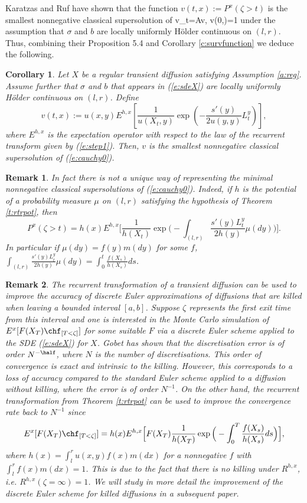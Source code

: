 \documentclass[11pt,reqno]{amsart}
\numberwithin{equation}{section}
\newtheorem{corollary}{Corollary}[section]
\newtheorem{remark}{Remark}[section]
\begin{document}
Karatzas and Ruf \cite{KR} have shown that the function $v(t,x):=P^x(\zeta>t)$ is the smallest nonnegative classical supersolution of 
\be \label{e:cauchy0}
v_t=Av, \qquad v(0,\cdot)=1
\ee
under the assumption that $\sigma$ and $b$ are locally uniformly H\"older continuous on $(l,r)$.  Thus,  combining their Proposition 5.4 and Corollary \ref{c:survfunction} we deduce the following.
\begin{corollary}  Let $X$ be a regular transient diffusion satisfying Assumption \ref{a:reg}. Assume further that $\sigma$ and $b$ that appears in (\ref{e:sdeX}) are locally uniformly H\"older continuous on $(l,r)$. Define
\[
v(t,x):= u(x,y)E^{h,x}\left[\frac{1}{u(X_t,y)}\exp\left(-\frac{s'(y)}{2u(y,y)}L^y_t\right)\right],
\]
where $E^{h,x}$ is the expectation operator with respect to the law of the recurrent transform given by (\ref{e:step1}).  Then, $v$ is the smallest nonnegative classical supersolution of (\ref{e:cauchy0}).
\end{corollary}
\begin{remark}
	In fact there is not a unique way of representing the minimal nonnegative classical supersolutions of (\ref{e:cauchy0}). Indeed, if $h$ is the potential of a probability measure $\mu$ on $(l,r)$ satisfying the hypothesis of Theorem \ref{t:rtrpot}, then
	\[
	P^x(\zeta>t)=  h(x)E^{h,x}\Big[\frac{1}{h(X_t)}\exp\Big(-\int_{(l,r)}\frac{s'(y)L^y_t}{2h(y)}\mu(dy)\Big)\Big].
	\] 
	In particular if $\mu(dy)=f(y)m(dy)$ for some $f$, $\int_{(l,r)}\frac{s'(y)L^y_t}{2h(y)}\mu(dy)=\int_0^t \frac{f(X_s)}{h(X_s)}ds$. 
\end{remark}
\begin{remark} \label{r:simulation}
	The recurrent transformation of a transient diffusion can be used to improve the accuracy of discrete Euler approximations of diffusions that are killed when leaving a bounded interval $[a,b]$. Suppose $\zeta$ represents the first exit time from this interval and one is interested in the Monte Carlo simulation of $E^x[F(X_T)\chf_{[T<\zeta]}]$ for some suitable $F$ via a discrete Euler scheme applied to the SDE (\ref{e:sdeX}) for $X$. Gobet \cite{GobetKilled} has shown that the discretisation error is of order $N^{-\half}$, where $N$ is the number of discretisations. This order of convergence is exact and intrinsic to the killing. However, this corresponds to a loss of accuracy compared to the standard Euler scheme applied to a diffusion without killing, where the error is of order $N^{-1}$. On the other hand, the recurrent transformation from Theorem \ref{t:rtrpot} can be used to improve the convergence rate back to $N^{-1}$ since
	\[
	E^x[F(X_T)\chf_{[T<\zeta]}]= h(x)E^{h,x}\Big[F(X_T) \frac{1}{h(X_T)}\exp\Big(-\int_0^T\frac{f(X_s)}{h(X_s)}ds\Big)\Big],
	\]  
	where $h(x)=\int_l^r u(x,y)f(x)m(dx)$ for a nonnegative $f$ with $\int_l^r f(x)m(dx)=1$. This is due to the fact that there is no killing under $R^{h,x}$, i.e. $R^{h,x}(\zeta=\infty)=1$. We will study in more detail the improvement of the discrete Euler scheme for killed diffusions in a subsequent paper.
\end{remark}
\end{document}
